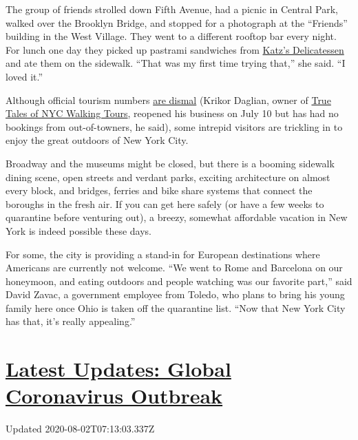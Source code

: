 The group of friends strolled down Fifth Avenue, had a picnic in Central
Park, walked over the Brooklyn Bridge, and stopped for a photograph at
the ``Friends'' building in the West Village. They went to a different
rooftop bar every night. For lunch one day they picked up pastrami
sandwiches from \href{https://katzsdelicatessen.com/}{Katz's
Delicatessen} and ate them on the sidewalk. ``That was my first time
trying that,'' she said. ``I loved it.''

Although official tourism numbers
\href{https://www.nytimes.com/2020/07/24/nyregion/nyc-tourism-coronavirus.html}{are
dismal} (Krikor Daglian, owner of
\href{http://www.truetalesnyc.com/}{True Tales of NYC Walking Tours},
reopened his business on July 10 but has had no bookings from
out-of-towners, he said), some intrepid visitors are trickling in to
enjoy the great outdoors of New York City.

Broadway and the museums might be closed, but there is a booming
sidewalk dining scene, open streets and verdant parks, exciting
architecture on almost every block, and bridges, ferries and bike share
systems that connect the boroughs in the fresh air. If you can get here
safely (or have a few weeks to quarantine before venturing out), a
breezy, somewhat affordable vacation in New York is indeed possible
these days.

For some, the city is providing a stand-in for European destinations
where Americans are currently not welcome. ``We went to Rome and
Barcelona on our honeymoon, and eating outdoors and people watching was
our favorite part,'' said David Zavac, a government employee from
Toledo, who plans to bring his young family here once Ohio is taken off
the quarantine list. ``Now that New York City has that, it's really
appealing.''

\hypertarget{latest-updates-global-coronavirus-outbreak}{%
\section{\texorpdfstring{\href{https://www.nytimes.com/2020/08/01/world/coronavirus-covid-19.html?action=click\&pgtype=Article\&state=default\&region=MAIN_CONTENT_1\&context=storylines_live_updates}{Latest
Updates: Global Coronavirus
Outbreak}}{Latest Updates: Global Coronavirus Outbreak}}\label{latest-updates-global-coronavirus-outbreak}}

Updated 2020-08-02T07:13:03.337Z

